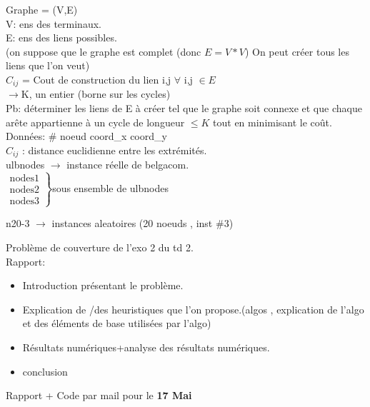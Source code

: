 \documentclass[frenchb]{article}
\begin{document}
				Graphe = (V,E) \\
				V: ens des terminaux.\\
				E: ens des liens possibles.\\
				(on suppose que le graphe est complet (donc $E=V*V$) On peut créer tous les liens que l'on veut)\\
				
				$C_{ij}$ = Cout de construction du lien i,j $\forall $ i,j $\in E $\\
				
				$\rightarrow $K, un entier (borne sur les cycles)\\
				
				Pb: déterminer les liens de E à créer tel que le graphe soit connexe et que chaque arête appartienne à un cycle de longueur $\le K$ tout en minimisant le coût.\\
				
				
				
				Données: \# noeud coord\_x  coord\_y\\
				
				$C_{ij}$ : distance euclidienne entre les extrémités.\\
				
				ulbnodes $\rightarrow$ instance réelle de belgacom.\\
				
				
				$
				\left.
				\begin{array}{l}
					\mbox{nodes1}\\
					\mbox{nodes2}\\
					\mbox{nodes3}
				\end{array}
				\right \}$sous ensemble de ulbnodes 
				
				
				n20-3 $\rightarrow$ instances aleatoires (20 noeuds , inst \#3)
				
				
				
				Problème de couverture de l'exo 2 du td 2.\\
				Rapport: 
				\begin{itemize}
					\item Introduction présentant le problème.\\
					\item Explication de /des heuristiques que l'on propose.(algos , explication de l'algo et des éléments de base utilisées par l'algo)\\
					\item Résultats numériques+analyse des résultats numériques.
					\item conclusion
				\end{itemize}
				Rapport + Code par mail pour le \textbf{17 Mai}
\end{document}
